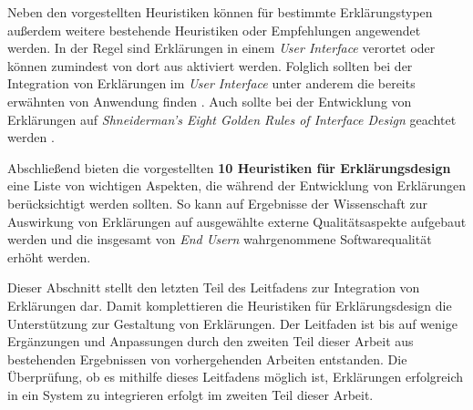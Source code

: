 Neben den vorgestellten Heuristiken können für bestimmte Erklärungstypen außerdem weitere bestehende Heuristiken oder Empfehlungen angewendet werden. In der Regel sind Erklärungen in einem \textit{User Interface} verortet oder können zumindest von dort aus aktiviert werden. Folglich sollten bei der Integration von Erklärungen im \textit{User Interface} unter anderem die bereits erwähnten  von \citeauthor{nielsen10usability} Anwendung finden \cite{nielsen10usability}. Auch sollte bei der Entwicklung von Erklärungen auf \textit{Shneiderman’s Eight Golden Rules of Interface Design} geachtet werden \cite{shneiderman2016designing}.

Abschließend bieten die vorgestellten \textbf{10 Heuristiken für Erklärungsdesign} eine Liste von wichtigen Aspekten, die während der Entwicklung von Erklärungen berücksichtigt werden sollten. So kann auf Ergebnisse der Wissenschaft zur Auswirkung von Erklärungen auf ausgewählte externe Qualitätsaspekte aufgebaut werden und die insgesamt von \textit{End Usern} wahrgenommene Softwarequalität erhöht werden.

\bigskip

Dieser Abschnitt stellt den letzten Teil des Leitfadens zur Integration von Erklärungen dar. Damit komplettieren die Heuristiken für Erklärungsdesign die Unterstützung zur Gestaltung von Erklärungen. Der Leitfaden ist bis auf wenige Ergänzungen und Anpassungen durch den zweiten Teil dieser Arbeit aus bestehenden Ergebnissen von vorhergehenden Arbeiten entstanden. Die Überprüfung, ob es mithilfe dieses Leitfadens möglich ist, Erklärungen erfolgreich in ein System zu integrieren erfolgt im zweiten Teil dieser Arbeit.